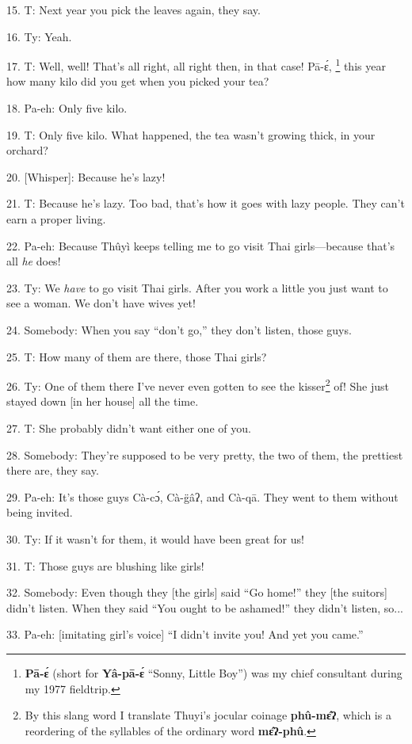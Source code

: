 15. T: Next year you pick the leaves again, they say.

16. Ty: Yeah.

17. T: Well, well! That's all right, all right then, in that case! Pā-ɛ́,
\footnote{\textbf{Pā-ɛ́} (short for \textbf{Yâ-pā-ɛ́} ``Sonny, Little Boy'') was my chief consultant during my 1977 fieldtrip.} this year how many kilo did you get when you picked your tea?

18. Pa-eh: Only five kilo.

19. T: Only five kilo. What happened, the tea wasn't growing thick, in your orchard?

20. [Whisper]: Because he's lazy!

21. T: Because he's lazy. Too bad, that's how it goes with lazy people. They
can't earn a proper living.

22. Pa-eh: Because Thûyì keeps telling me to go visit Thai girls---because that's
all \textit{he} does!

23. Ty: We \textit{have} to go visit Thai girls. After you work a little you just
want to see a woman. We don't have wives yet!

24. Somebody: When you say ``don't go,'' they don't listen, those guys.

25. T: How many of them are there, those Thai girls?

26. Ty: One of them there I've never even gotten to see the kisser\footnote{By this slang word I translate Thuyi's jocular coinage \textbf{phû-mɛ̂ʔ}, which is a reordering of the syllables of the ordinary word \textbf{mɛ̂ʔ-phû}.} of! She
just stayed down [in her house] all the time.

27. T: She probably didn't want either one of you.

28. Somebody: They're supposed to be very pretty, the two of them, the prettiest
there are, they say.

29. Pa-eh: It's those guys Cà-cɔ́, Cà-g̈âʔ, and Cà-qā. They went to
them without being invited.

30. Ty: If it wasn't for them, it would have been great for us!

31. T: Those guys are blushing like girls!

32. Somebody: Even though they [the girls] said ``Go home!'' they [the suitors]
didn't listen. When they said ``You ought to be ashamed!'' they didn't listen,
so...

33. Pa-eh: [imitating girl's voice] ``I didn't invite you! And yet you came.''

